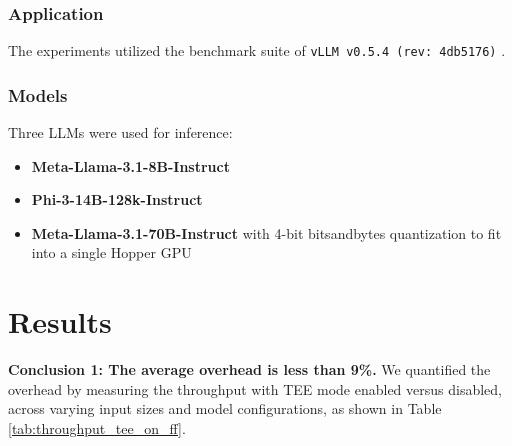 \documentclass{article}
\begin{document}
\subsubsection{Application}

The experiments utilized the benchmark suite of \texttt{vLLM v0.5.4 (rev: 4db5176)} \cite{kwon2023efficient}.

\subsubsection{Models}

Three LLMs were used for inference:

\begin{itemize}
    \item \textbf{Meta-Llama-3.1-8B-Instruct}
    \item \textbf{Phi-3-14B-128k-Instruct}
    \item \textbf{Meta-Llama-3.1-70B-Instruct} with 4-bit bitsandbytes quantization to fit into a single Hopper GPU
\end{itemize}

\section{Results}

\noindent\textbf{Conclusion 1: The average overhead is less than 9\%.} We quantified the overhead by measuring the throughput with TEE mode enabled versus disabled, across varying input sizes and model configurations, as shown in Table \ref{tab:throughput_tee_on_ff}.
\end{document}
